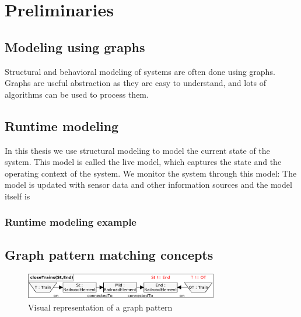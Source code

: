 
\chapter{Preliminaries}



\section{Modeling using graphs}

Structural and behavioral modeling of systems are often done using graphs. Graphs are useful abstraction as they are easy to understand, and lots of algorithms can be used to process them.

\section{Runtime modeling}

In this thesis we use structural modeling to model the current state of the system. This model is called the live model, which captures the state and the operating context of the system. We monitor the system through this model: The model is updated with sensor data and other information sources and the model itself is 

\subsection{Runtime modeling example}



\section{Graph pattern matching concepts}

\begin{figure}[h]
	\begin{center}
		\includegraphics[width=0.75\textwidth]{figures/pattern-visual.pdf}
		\caption{Visual representation of a graph pattern}
		\label{pattern-visual}
	\end{center}
\end{figure}

